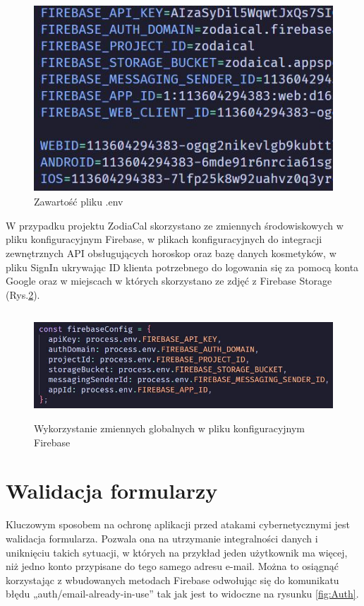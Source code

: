 \begin{figure}[ht]
	\centering
	\vspace{0.25cm}
	\includegraphics[height=7cm]{images/bezpieczenstwo/env}
	\caption{Zawartość pliku .env}
	\label{fig:Env}
\end{figure}

\newpage
W przypadku projektu ZodiaCal skorzystano ze zmiennych środowiskowych w pliku konfiguracyjnym Firebase, w plikach konfiguracyjnych do integracji zewnętrznych API obsługujących horoskop oraz bazę danych kosmetyków, w pliku SignIn ukrywając ID klienta potrzebnego do logowania się za pomocą konta Google oraz w miejscach w których skorzystano ze zdjęć z Firebase Storage (Rys.\ref{fig:FirebaseConfig}).

\begin{figure}[ht]
	\centering
	\vspace{0.25cm}
	\includegraphics[height=4cm]{images/bezpieczenstwo/firebaseConfig}
	\caption{Wykorzystanie zmiennych globalnych w pliku konfiguracyjnym Firebase}
	\label{fig:FirebaseConfig}
\end{figure}

\section*{Walidacja formularzy}
Kluczowym sposobem na ochronę aplikacji przed atakami cybernetycznymi jest walidacja formularza. Pozwala ona na utrzymanie integralności danych i uniknięciu takich sytuacji, w których na przykład jeden użytkownik ma więcej, niż jedno konto przypisane do tego samego adresu e-mail. Można to osiągnąć korzystając z wbudowanych metodach Firebase odwołując się do komunikatu błędu „auth/email-already-in-use” tak jak jest to widoczne na rysunku \ref{fig:Auth}.

